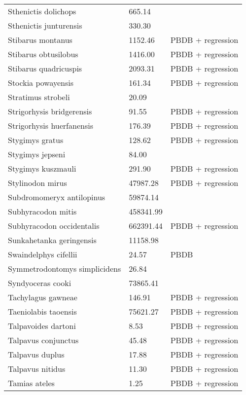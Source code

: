 \documentclass{article}
\begin{document}
\begin{center}
\begin{longtable}{p{} p{} p{}}
    Sthenictis dolichops & 665.14 & \cite{Tomiya2013} \\ 
    Sthenictis junturensis & 330.30 & \cite{Tomiya2013} \\ 
    Stibarus montanus & 1152.46 & PBDB + regression \\ 
    Stibarus obtusilobus & 1416.00 & PBDB + regression \\ 
    Stibarus quadricuspis & 2093.31 & PBDB + regression \\ 
    Stockia powayensis & 161.34 & PBDB + regression \\ 
    Stratimus strobeli & 20.09 & \cite{Tomiya2013} \\ 
    Strigorhysis bridgerensis & 91.55 & PBDB + regression \\ 
    Strigorhysis huerfanensis & 176.39 & PBDB + regression \\ 
    Stygimys gratus & 128.62 & PBDB + regression \\ 
    Stygimys jepseni & 84.00 & \cite{Wilson2012} \\ 
    Stygimys kuszmauli & 291.90 & PBDB + regression \\ 
    Stylinodon mirus & 47987.28 & PBDB + regression \\ 
    Subdromomeryx antilopinus & 59874.14 & \cite{Tomiya2013} \\ 
    Subhyracodon mitis & 458341.99 & \cite{Scott1940} \\ 
    Subhyracodon occidentalis & 662391.44 & PBDB + regression \\ 
    Sunkahetanka geringensis & 11158.98 & \cite{Tomiya2013} \\ 
    Swaindelphys cifellii & 24.57 & PBDB \\ 
    Symmetrodontomys simplicidens & 26.84 & \cite{Tomiya2013} \\ 
    Syndyoceras cooki & 73865.41 & \cite{Tomiya2013} \\ 
    Tachylagus gawneae & 146.91 & PBDB + regression \\ 
    Taeniolabis taoensis & 75621.27 & PBDB + regression \\ 
    Talpavoides dartoni & 8.53 & PBDB + regression \\ 
    Talpavus conjunctus & 45.48 & PBDB + regression \\ 
    Talpavus duplus & 17.88 & PBDB + regression \\ 
    Talpavus nitidus & 11.30 & PBDB + regression \\ 
    Tamias ateles & 1.25 & PBDB + regression \\ 

\end{longtable}
\end{center}
\end{document}

